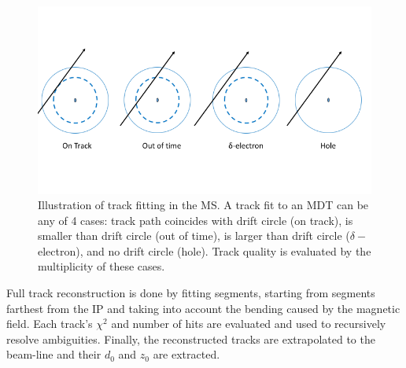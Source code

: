 \begin{figure}
	\centering
   \includegraphics[width=\textwidth]{figures/mstrackMDT.png}
	\caption{Illustration of track fitting in the MS. A track fit to an MDT can be any of 4 cases: track path coincides with drift circle (on track), 
is smaller than drift circle (out of time), is larger than drift circle ($\delta-$electron), and no drift 
circle (hole). Track quality is evaluated by the multiplicity of these cases.}
	\label{fig:mstrackQ}
\end{figure}

\par Full track reconstruction is done by fitting segments, starting from segments farthest 
from the IP and taking into account the bending caused by the 
magnetic field. Each track's $\chi^2$ and number of hits are evaluated and used to 
recursively resolve ambiguities. Finally, the reconstructed tracks are extrapolated to the 
beam-line and their $d_0$ and $z_0$ are extracted. 
    
